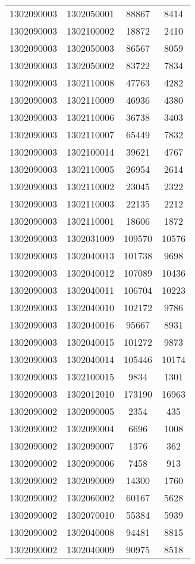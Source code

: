 \begin{longtable}[h]{llcc}
		1302090003 & 1302050001 & 88867 & 8414\\
		1302090003 & 1302100002 & 18872 & 2410\\
		1302090003 & 1302050003 & 86567 & 8059\\
		1302090003 & 1302050002 & 83722 & 7834\\
		1302090003 & 1302110008 & 47763 & 4282\\
		1302090003 & 1302110009 & 46936 & 4380\\
		1302090003 & 1302110006 & 36738 & 3403\\
		1302090003 & 1302110007 & 65449 & 7832\\
		1302090003 & 1302100014 & 39621 & 4767\\
		1302090003 & 1302110005 & 26954 & 2614\\
		1302090003 & 1302110002 & 23045 & 2322\\
		1302090003 & 1302110003 & 22135 & 2212\\
		1302090003 & 1302110001 & 18606 & 1872\\
		1302090003 & 1302031009 & 109570 & 10576\\
		1302090003 & 1302040013 & 101738 & 9698\\
		1302090003 & 1302040012 & 107089 & 10436\\
		1302090003 & 1302040011 & 106704 & 10223\\
		1302090003 & 1302040010 & 102172 & 9786\\
		1302090003 & 1302040016 & 95667 & 8931\\
		1302090003 & 1302040015 & 101272 & 9873\\
		1302090003 & 1302040014 & 105446 & 10174\\
		1302090003 & 1302100015 & 9834 & 1301\\
		1302090003 & 1302012010 & 173190 & 16963\\
		1302090002 & 1302090005 & 2354 & 435\\
		1302090002 & 1302090004 & 6696 & 1008\\
		1302090002 & 1302090007 & 1376 & 362\\
		1302090002 & 1302090006 & 7458 & 913\\
		1302090002 & 1302090009 & 14300 & 1760\\
		1302090002 & 1302060002 & 60167 & 5628\\
		1302090002 & 1302070010 & 55384 & 5939\\
		1302090002 & 1302040008 & 94481 & 8815\\
		1302090002 & 1302040009 & 90975 & 8518\\

\end{longtable}

